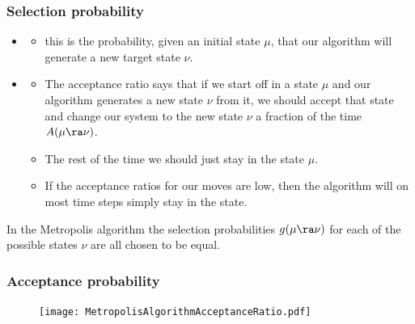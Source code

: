 \documentclass[hyperref={colorlinks=true}]{beamer}
\begin{document}
\begin{frame}%
  \frametitle{Selection probability}
  
  \begin{itemize}
    \item {}
    \begin{itemize}
      \item this is the probability, given an initial state $\mu$, that our algorithm will generate a new target state $\nu$. 
    \end{itemize}
    \item {}
    \begin{itemize}
      \item The acceptance ratio says that if we start off in a state $\mu$ and our algorithm generates a new state $\nu$ from it, we should accept that state and change our system to the new state $\nu$ a fraction of the time $A(\mu \ra \nu)$. 
      \item The rest of the time we should just stay in the state $\mu$.
      \item If the acceptance ratios for our moves are low, then the algorithm will on most time steps simply stay in the state.
    \end{itemize}
  \end{itemize}
  
  In the Metropolis algorithm the selection probabilities $g(\mu \ra \nu)$ for each of the possible states $\nu$ are all chosen to be equal.
  
\end{frame}


\begin{frame}%
  \frametitle{Acceptance probability}
  
  \begin{figure}
    \centering
    \texttt{[image: MetropolisAlgorithmAcceptanceRatio.pdf]}
  \end{figure}
  
\end{frame}

\end{document}
